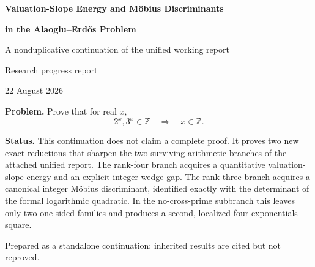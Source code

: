 \documentclass[11pt,oneside]{article}
\theoremstyle{research}
\theoremstyle{definition}
\newcommand{\Z}{\mathbb Z}
\begin{document}
\begin{titlepage}
\centering
\vspace*{1.2cm}
{\Huge\bfseries\color{deepblue}
Valuation-Slope Energy and M\"obius Discriminants\par}
\vspace{0.35cm}
{\LARGE\bfseries in the Alaoglu--Erdős Problem\par}
\vspace{0.8cm}
{\Large A nonduplicative continuation of the unified working report\par}
\vspace{1.3cm}
{\large Research progress report\par}
\vspace{0.2cm}
{\large 22 August 2026\par}
\vfill
\begin{minipage}{0.84\textwidth}
\small
\textbf{Problem.}  Prove that for real $x$,
\[
  2^x,3^x\in\Z \quad\Longrightarrow\quad x\in\Z.
\]

\textbf{Status.}  This continuation does not claim a complete proof.  It proves two
new exact reductions that sharpen the two surviving arithmetic branches of the
attached unified report.  The rank-four branch acquires a quantitative
valuation-slope energy and an explicit integer-wedge gap.  The rank-three branch
acquires a canonical integer M\"obius discriminant, identified exactly with the
determinant of the formal logarithmic quadratic.  In the no-cross-prime
subbranch this leaves only two one-sided families and produces a second,
localized four-exponentials square.
\end{minipage}
\vfill
{\small Prepared as a standalone continuation; inherited results are cited but not reproved.}
\end{titlepage}
\end{document}
